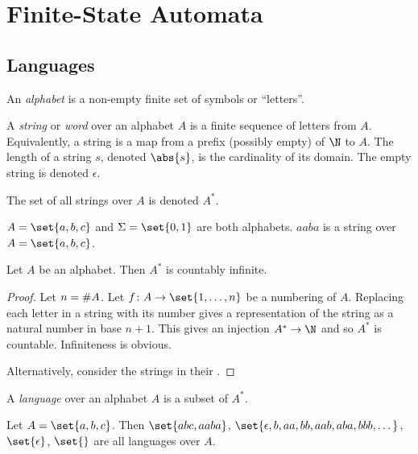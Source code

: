 \chapter{Finite-State Automata} \label{chp:fa}
\section{Languages} \label{sec:languages}

\begin{definition*}
    An \emph{alphabet} is a non-empty finite set of symbols or ``letters''.

    A \emph{string} or \emph{word} over an alphabet $A$ is a finite sequence
    of letters from $A$.
    Equivalently, a string is a map from a prefix (possibly empty) of $\N$
    to $A$.
    The length of a string $s$, denoted $\abs{s}$,
    is the cardinality of its domain.
    The empty string is denoted $\epsilon$.

    The set of all strings over $A$ is denoted $A^*$.
\end{definition*}
\begin{example}
    $A = \set{a, b, c}$ and $\Sigma = \set{0, 1}$ are both alphabets.
    $aaba$ is a string over $A = \set{a, b, c}$.
\end{example}

\begin{proposition}
    Let $A$ be an alphabet.
    Then $A^*$ is countably infinite.
\end{proposition}
\begin{proof}
    Let $n = \# A$.
    Let $f \colon A \to \set{1, \dots, n}$ be a numbering of $A$.
    Replacing each letter in a string with its number gives a representation
    of the string as a natural number in base $n + 1$.
    This gives an injection $A^* \to \N$ and so $A^*$ is countable.
    Infiniteness is obvious.

    Alternatively, consider the strings in their
    .
\end{proof}

\begin{definition*}[Language] \label{def:languages:language}
    A \emph{language} over an alphabet $A$ is a subset of $A^*$.
\end{definition*}
\begin{example}
    Let $A = \set{a, b, c}$.
    Then $\set{abc, aaba}$,
    $\set{\epsilon, b, aa, bb, aab, aba, bbb, \dots}$, $\set{\epsilon}$,
    $\set{}$ are all languages over $A$.
\end{example}

